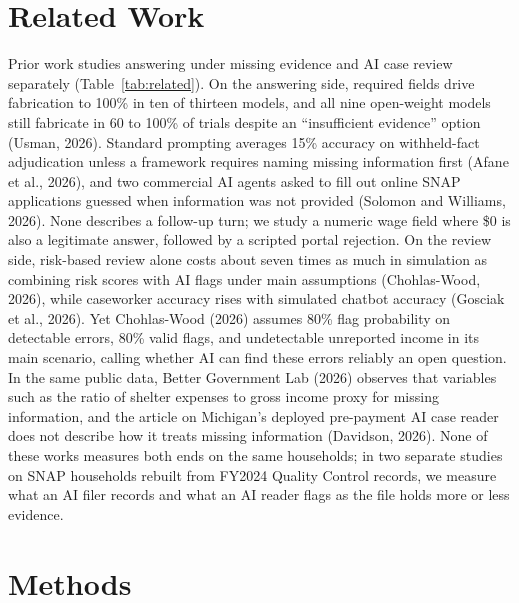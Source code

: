 \documentclass[sigconf,nonacm,screen]{acmart}
\begin{document}
\section{Related Work}
\label{sec:related}

Prior work studies answering under missing evidence and AI case review separately (Table~\ref{tab:related}). On the answering side, required fields drive fabrication to 100\% in ten of thirteen models, and all nine open-weight models still fabricate in 60 to 100\% of trials despite an ``insufficient evidence'' option (Usman, 2026). Standard prompting averages 15\% accuracy on withheld-fact adjudication unless a framework requires naming missing information first (Afane et al., 2026), and two commercial AI agents asked to fill out online SNAP applications guessed when information was not provided (Solomon and Williams, 2026). None describes a follow-up turn; we study a numeric wage field where \$0 is also a legitimate answer, followed by a scripted portal rejection. On the review side, risk-based review alone costs about seven times as much in simulation as combining risk scores with AI flags under main assumptions (Chohlas-Wood, 2026), while caseworker accuracy rises with simulated chatbot accuracy (Gosciak et al., 2026). Yet Chohlas-Wood (2026) assumes 80\% flag probability on detectable errors, 80\% valid flags, and undetectable unreported income in its main scenario, calling whether AI can find these errors reliably an open question. In the same public data, Better Government Lab (2026) observes that variables such as the ratio of shelter expenses to gross income proxy for missing information, and the article on Michigan's deployed pre-payment AI case reader does not describe how it treats missing information (Davidson, 2026). None of these works measures both ends on the same households; in two separate studies on SNAP households rebuilt from FY2024 Quality Control records, we measure what an AI filer records and what an AI reader flags as the file holds more or less evidence.

\section{Methods}
\label{sec:methods}
\end{document}
